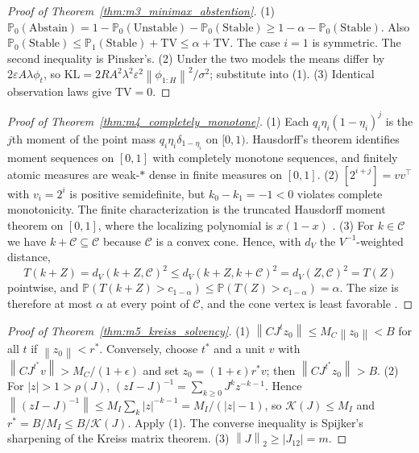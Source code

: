 \documentclass[10pt,twocolumn,letterpaper]{article}
\theoremstyle{definition}
\theoremstyle{remark}
\newcommand{\norm}[1]{\left\lVert #1\right\rVert}
\begin{document}
\begin{proof}[Proof of Theorem~\ref{thm:m3_minimax_abstention}]
(1) $\mathbb P_0(\mathrm{Abstain})=1-\mathbb P_0(\mathrm{Unstable})-\mathbb P_0(\mathrm{Stable})\ge1-\alpha-\mathbb P_0(\mathrm{Stable})$. Also $\mathbb P_0(\mathrm{Stable})\le\mathbb P_1(\mathrm{Stable})+\mathrm{TV}\le\alpha+\mathrm{TV}$. The case $i=1$ is symmetric. The second inequality is Pinsker's. (2) Under the two models the means differ by $2\varepsilon A\lambda\phi_t$, so $\mathrm{KL}=2RA^2\lambda^2\varepsilon^2\norm{\phi_{1:H}}^2/\sigma^2$; substitute into (1). (3) Identical observation laws give $\mathrm{TV}=0$.
\end{proof}

\begin{proof}[Proof of Theorem~\ref{thm:m4_completely_monotone}]
(1) Each $q_i\eta_i(1-\eta_i)^j$ is the $j$th moment of the point mass $q_i\eta_i\delta_{1-\eta_i}$ on $[0,1)$. Hausdorff's theorem identifies moment sequences on $[0,1]$ with completely monotone sequences, and finitely atomic measures are weak-$*$ dense in finite measures on $[0,1]$. (2) $[2^{i+j}]=vv^\top$ with $v_i=2^i$ is positive semidefinite, but $k_0-k_1=-1<0$ violates complete monotonicity. The finite characterization is the truncated Hausdorff moment theorem on $[0,1]$, where the localizing polynomial is $x(1-x)$ \citep{krein1977}. (3) For $k\in\mathcal C$ we have $k+\mathcal C\subseteq\mathcal C$ because $\mathcal C$ is a convex cone. Hence, with $d_V$ the $V^{-1}$-weighted distance,
\[
T(k+Z)=d_V(k+Z,\mathcal C)^2\le d_V(k+Z,k+\mathcal C)^2=d_V(Z,\mathcal C)^2=T(Z)
\]
pointwise, and $\mathbb P(T(k+Z)>c_{1-\alpha})\le\mathbb P(T(Z)>c_{1-\alpha})=\alpha$. The size is therefore at most $\alpha$ at every point of $\mathcal C$, and the cone vertex is least favorable \citep{perlman1969}.
\end{proof}

\begin{proof}[Proof of Theorem~\ref{thm:m5_kreiss_solvency}]
(1) $\norm{CJ^tz_0}\le M_C\norm{z_0}<B$ for all $t$ if $\norm{z_0}<r^*$. Conversely, choose $t^*$ and a unit $v$ with $\norm{CJ^{t^*}v}>M_C/(1+\epsilon)$ and set $z_0=(1+\epsilon)r^*v$; then $\norm{CJ^{t^*}z_0}>B$. (2) For $|z|>1>\rho(J)$, $(zI-J)^{-1}=\sum_{k\ge0}J^kz^{-k-1}$. Hence $\norm{(zI-J)^{-1}}\le M_I\sum_k|z|^{-k-1}=M_I/(|z|-1)$, so $\mathcal K(J)\le M_I$ and $r^*=B/M_I\le B/\mathcal K(J)$. Apply (1). The converse inequality is Spijker's sharpening of the Kreiss matrix theorem. (3) $\norm{J}_2\ge|J_{12}|=m$.
\end{proof}
\end{document}
